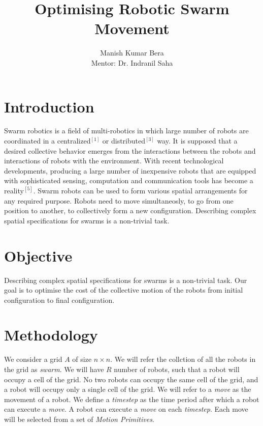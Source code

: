 \documentclass{article}[11pt]
\title{Optimising Robotic Swarm Movement}
\author{Manish Kumar Bera \\
Mentor: Dr. Indranil Saha
}
\begin{document}
	\maketitle

	\section{Introduction}
		Swarm robotics is a field of multi-robotics in which large number of robots are coordinated in a centralized$^{[1]}$ or distributed$^{[3]}$ way.
		It is supposed that a desired collective behavior emerges from the interactions between the robots and interactions of robots with the environment.
		With  recent  technological  developments, producing a large number of inexpensive robots that are  equipped  with  sophisticated  sensing,  computation and communication tools has become a reality$^{[5]}$. 
		Swarm robots can be used to form various spatial arrangements for any required purpose.
		Robots need to move simultaneosly, to go from one position to another, to collectively form a new configuration.
		Describing  complex  spatial  specifications  for  swarms  is a  non-trivial  task.

	\section{Objective}
		Describing  complex  spatial  specifications  for  swarms  is a  non-trivial  task.
		Our goal is to optimise the cost of the collective motion of the robots from initial configuration to final configuration.

	\section{Methodology}
		We consider a grid $A$ of size $n \times n$.
		We will refer the collction of all the robots in the grid as \textit{swarm}. 
		We will have $R$ number of robots, such that a robot will occupy a cell of the grid.
		No two robots can occupy the same cell of the grid, and a robot will occupy only a single cell of the grid.
		We will refer to a \textit{move} as the movement of a robot.
		We define a \textit{timestep} as the time period after which a robot can execute a \textit{move}.
		A robot can execute a \textit{move} on each \textit{timestep}.
		Each move will be selected from a set of \textit{Motion Primitives}. 
\end{document}
